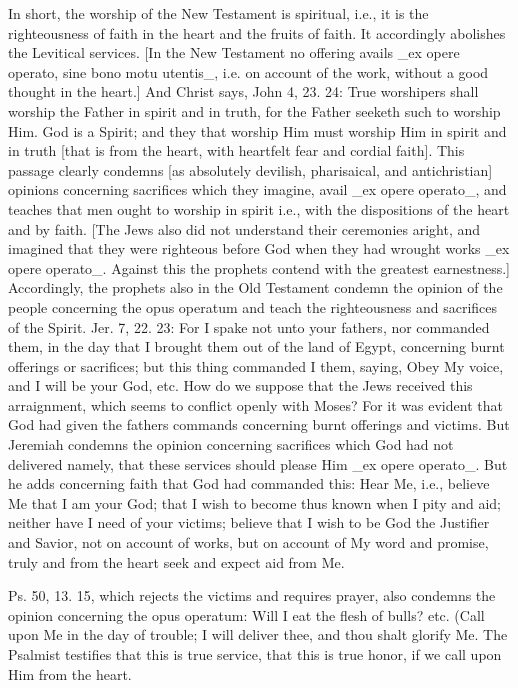 In short, the worship of the New Testament is spiritual, i.e., it is
the righteousness of faith in the heart and the fruits of faith.  It
accordingly abolishes the Levitical services.  [In the New Testament
no offering avails _ex opere operato, sine bono motu utentis_, i.e.
on account of the work, without a good thought in the heart.] And
Christ says, John 4, 23. 24: True worshipers shall worship the Father
in spirit and in truth, for the Father seeketh such to worship Him.
God is a Spirit; and they that worship Him must worship Him in spirit
and in truth [that is from the heart, with heartfelt fear and cordial
faith].  This passage clearly condemns [as absolutely devilish,
pharisaical, and antichristian] opinions concerning sacrifices which
they imagine, avail _ex opere operato_, and teaches that men ought to
worship in spirit i.e., with the dispositions of the heart and by
faith.  [The Jews also did not understand their ceremonies aright,
and imagined that they were righteous before God when they had
wrought works _ex opere operato_.  Against this the prophets contend
with the greatest earnestness.] Accordingly, the prophets also in the
Old Testament condemn the opinion of the people concerning the opus
operatum and teach the righteousness and sacrifices of the Spirit.
Jer. 7, 22. 23: For I spake not unto your fathers, nor commanded them,
in the day that I brought them out of the land of Egypt, concerning
burnt offerings or sacrifices; but this thing commanded I them,
saying, Obey My voice, and I will be your God, etc. How do we suppose
that the Jews received this arraignment, which seems to conflict
openly with Moses?  For it was evident that God had given the fathers
commands concerning burnt offerings and victims.  But Jeremiah
condemns the opinion concerning sacrifices which God had not
delivered namely, that these services should please Him _ex opere
operato_.  But he adds concerning faith that God had commanded this:
Hear Me, i.e., believe Me that I am your God; that I wish to become
thus known when I pity and aid; neither have I need of your victims;
believe that I wish to be God the Justifier and Savior, not on
account of works, but on account of My word and promise, truly and
from the heart seek and expect aid from Me.

Ps. 50, 13. 15, which rejects the victims and requires prayer, also
condemns the opinion concerning the opus operatum: Will I eat the
flesh of bulls? etc. (Call upon Me in the day of trouble; I will
deliver thee, and thou shalt glorify Me.  The Psalmist testifies that
this is true service, that this is true honor, if we call upon Him
from the heart.

